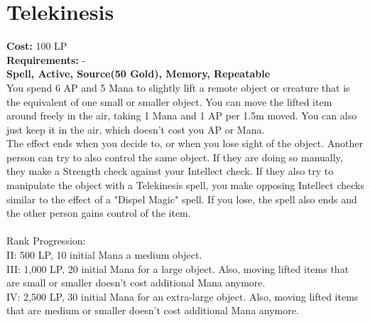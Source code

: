 \section{Telekinesis}\label{spell:telekinesis}
\textbf{Cost:} 100 LP\\
\textbf{Requirements:} -\\
\textbf{Spell, Active, Source(50 Gold), Memory, Repeatable}\\
You spend 6 AP and 5 Mana to slightly lift a remote object or creature that is the equivalent of one small or smaller object.
You can move the lifted item around freely in the air, taking 1 Mana and 1 AP per 1.5m moved.
You can also just keep it in the air, which doesn't cost you AP or Mana.\\
The effect ends when you decide to, or when you lose sight of the object.
Another person can try to also control the same object.
If they are doing so manually, they make a Strength check against your Intellect check.
If they also try to manipulate the object with a Telekinesis spell, you make opposing Intellect checks similar to the effect of a "Dispel Magic" spell.
If you lose, the spell also ends and the other person gains control of the item.\\
\\
Rank Progression:\\
II: 500 LP, 10 initial Mana a medium object.\\

III: 1,000 LP, 20 initial Mana for a large object.
Also, moving lifted items that are small or smaller doesn't cost additional Mana anymore.\\

IV: 2,500 LP, 30 initial Mana for an extra-large object.
Also, moving lifted items that are medium or smaller doesn't cost additional Mana anymore.